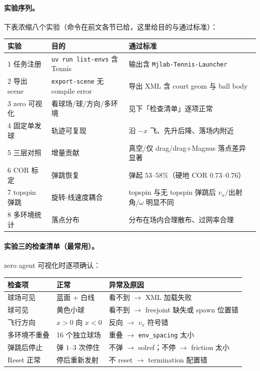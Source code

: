 \paragraph{实验序列。}下表浓缩八个实验（命令在前文各节已给，这里给目的与通过标准）：

\begin{center}
\small
\begin{tabular}{@{}llp{6.0cm}@{}}
\toprule
实验 & 目的 & 通过标准 \\
\midrule
1 任务注册 & \verb|uv run list-envs| 含 Tennis & 输出含 \verb|Mjlab-Tennis-Launcher| \\
2 导出 scene & \verb|export-scene| 无 compile error & 导出 XML 含 court geom 与 ball body \\
3 zero 可视化 & 看球场/球/方向/多环境 & 见下「检查清单」逐项正常 \\
4 固定单发球 & 轨迹可复现 & 沿 $-x$ 飞、先升后降、落场内附近 \\
5 三层对照 & 增量贡献 & 真空/仅 drag/drag+Magnus 落点差异显著 \\
6 COR 标定 & 弹跳恢复 & 弹起 $53$--$58\%$（硬地 COR $0.73$--$0.76$） \\
7 topspin 弹跳 & 旋转-线速度耦合 & topspin 与无 topspin 弹跳后 $v_x$/出射角/$\omega$ 明显不同 \\
8 多环境统计 & 落点分布 & 分布在场内合理散布、过网率合理 \\
\bottomrule
\end{tabular}
\end{center}

\paragraph{实验三的检查清单（最常用）。}zero agent 可视化时逐项确认：

\begin{center}
\small
\begin{tabular}{@{}lll@{}}
\toprule
检查项 & 正常 & 异常及原因 \\
\midrule
球场可见 & 蓝面 $+$ 白线 & 看不到 $\to$ XML 加载失败 \\
球可见 & 黄色小球 & 看不到 $\to$ freejoint 缺失或 spawn 位置错 \\
飞行方向 & $x>0$ 向 $x<0$ & 反向 $\to$ $v_x$ 符号错 \\
多环境不重叠 & 16 个独立球场 & 重叠 $\to$ \verb|env_spacing| 太小 \\
弹跳后停止 & 弹 $1$--$3$ 次停住 & 不弹 $\to$ solref；不停 $\to$ friction 太小 \\
Reset 正常 & 停后重新发射 & 不 reset $\to$ termination 配置错 \\
\bottomrule
\end{tabular}
\end{center}

